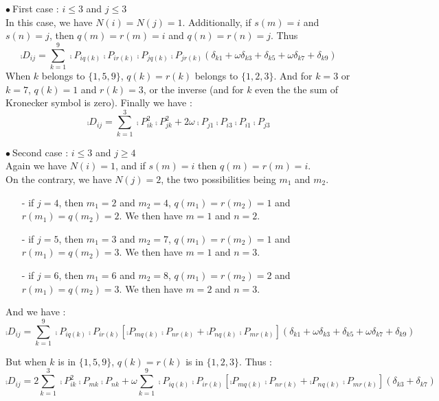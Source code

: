 \vspace{1cm}
$\bullet\ ${\sc First case} : $i\leqslant 3$ and $j\leqslant 3$\\
In this case, we have $N(i)=N(j)=1$. Additionally, if $s(m)=i$ and $s(n)=j$,
then $q(m)=r(m)=i$ and $q(n)=r(n)=j$. Thus \\
\begin{equation}
\comp{D}_{ij}=\sum_{k=1}^9
\comp{P}_{iq(k)}\comp{P}_{ir(k)}\comp{P}_{jq(k)}\comp{P}_{jr(k)}
(\delta_{k1}+\omega\delta_{k3}+\delta_{k5}+\omega\delta_{k7}+\delta_{k9})
\end{equation}
When $k$ belongs to $\{1,5,9\}$, $q(k)=r(k)$ belongs to $\{1,2,3\}$. And for $k=3$ or
$k=7$, $q(k)=1$ and $r(k)=3$, or the inverse (and for $k$ even the
the sum of Kronecker symbol is zero). Finally we have :
\begin{equation}
\comp{D}_{ij}=\sum_{k=1}^3\comp{P}_{ik}^2\comp{P}_{jk}^2
+2\omega\comp{P}_{j1}\comp{P}_{i3}\comp{P}_{i1}\comp{P}_{j3}
\end{equation}

\vspace{1cm}
$\bullet\ ${\sc Second case} : $i\leqslant 3$ and $j\geqslant 4$\\
Again we have $N(i)=1$, and if $s(m)=i$ then $q(m)=r(m)=i$.\\
On the contrary, we have $N(j)=2$, the two possibilities being $m_1$ and $m_2$.\\
\begin{itemize}
\item[-] if $j=4$, then $m_1=2$ and $m_2=4$,
$q(m_1)=r(m_2)=1$ and $r(m_1)=q(m_2)=2$. We then have
$m=1$ and $n=2$.

\item[-] if $j=5$, then $m_1=3$ and $m_2=7$,
$q(m_1)=r(m_2)=1$ and $r(m_1)=q(m_2)=3$. We then have
$m=1$ and $n=3$.

\item[-] if $j=6$, then $m_1=6$ and $m_2=8$,
$q(m_1)=r(m_2)=2$ and $r(m_1)=q(m_2)=3$. We then have
$m=2$ and $n=3$.
\end{itemize}

And we have :
\begin{equation}
\comp{D}_{ij}=\sum_{k=1}^9
\comp{P}_{iq(k)}\comp{P}_{ir(k)}\left[
\comp{P}_{mq(k)}\comp{P}_{nr(k)}+\comp{P}_{nq(k)}\comp{P}_{mr(k)}\right]
(\delta_{k1}+\omega\delta_{k3}+\delta_{k5}+\omega\delta_{k7}+\delta_{k9})
\end{equation}

But when $k$ is in $\{1,5,9\}$, $q(k)=r(k)$ is in $\{1,2,3\}$. Thus :
\begin{equation}
\comp{D}_{ij}=2\sum_{k=1}^3
\comp{P}_{ik}^2\comp{P}_{mk}\comp{P}_{nk}
+\omega\sum_{k=1}^9
\comp{P}_{iq(k)}\comp{P}_{ir(k)}\left[
\comp{P}_{mq(k)}\comp{P}_{nr(k)}+\comp{P}_{nq(k)}\comp{P}_{mr(k)}\right]
(\delta_{k3}+\delta_{k7})
\end{equation}

